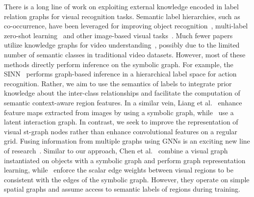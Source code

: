 \documentclass[runningheads]{llncs}
\begin{document}
 There is a long line of work on exploiting
external knowledge encoded in label relation graphs for visual recognition
tasks. Semantic label hierarchies, such as co-occurrence,
have been leveraged for
improving object recognition~\cite{Marszalek:ECCV08,Marszalek:CVPR07,Choi:CVPR10,Deng:ECCV14}, multi-label zero-shot learning~\cite{Lee:CVPR18} and other image-based visual tasks~\cite{Li:ICCV17,Ramanathan:CVPR15}. Much fewer papers utilize knowledge graphs for video understanding~\cite{Assari:CVPR14,Jiang:TPAMI18,Junior:TPAMI19}, possibly due to the limited number of semantic classes in traditional video datasets. However, most of these methods directly perform inference on the symbolic graph. For example, the SINN~\cite{Junior:TPAMI19} performs graph-based inference in a hierarchical label space for action recognition. 
Rather, we aim to use the semantics of labels to integrate prior knowledge about the inter-class relationships and facilitate the computation of semantic context-aware region features. In a similar vein, Liang et al.~\cite{Liang:NIPS18} enhance feature maps extracted from images by using a symbolic graph, while~\cite{Li:NIPS18,Chen:CVPR19} use a latent interaction graph. In contrast, we seek to improve the representation of visual st-graph nodes rather than enhance convolutional features on a regular grid. Fusing information from multiple graphs using GNNs is an exciting new line of research~\cite{Bajaj:ICCV19,Li:ICCV19,Xiong:ICCV19,Yu:NIPS19,Teney:CVPR17}. Similar to our approach, Chen et al.~\cite{Chen:CVPR18} combine a
visual graph instantiated on objects with a symbolic graph and perform graph representation learning, while~\cite{Jiang:NIPS18} enforce the scalar edge weights between visual regions to be consistent with the edges of the symbolic graph. However, they operate on simple spatial graphs and assume access to semantic labels of regions during training.
 
\end{document}
